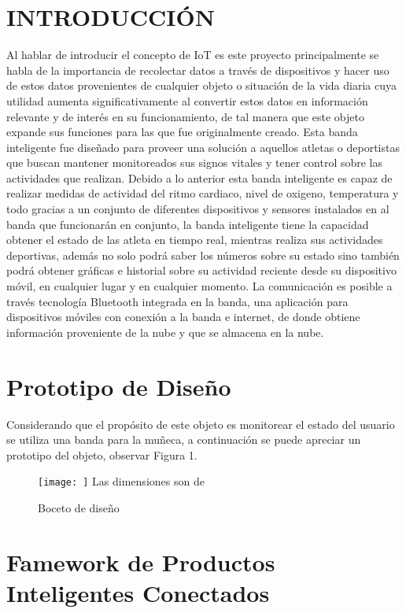 \documentclass[osajnl,twocolumn,showpacs,superscriptaddress,10pt]{revtex4-1}
\begin{document}
\section{INTRODUCCIÓN}
Al hablar de introducir el concepto de IoT es este proyecto principalmente se habla de la importancia de recolectar datos a través de dispositivos y hacer uso de estos datos provenientes de cualquier objeto o situación de la vida diaria cuya utilidad aumenta significativamente al convertir estos datos en información relevante y de interés en su funcionamiento, de tal manera que este objeto expande sus funciones para las que fue originalmente creado. Esta banda inteligente fue diseñado para proveer una solución a aquellos atletas o deportistas que buscan mantener monitoreados sus signos vitales y tener control sobre las actividades que realizan. Debido a lo anterior esta banda inteligente es capaz de realizar medidas de actividad del ritmo cardiaco, nivel de oxigeno, temperatura y todo gracias a un conjunto de diferentes dispositivos y sensores instalados en al banda que funcionarán en conjunto, la banda inteligente tiene la capacidad obtener el estado de las atleta en tiempo real, mientras realiza sus actividades deportivas, además no solo podrá saber los números sobre su estado sino también podrá obtener gráficas e historial sobre su actividad reciente desde su dispositivo móvil, en cualquier lugar y en cualquier momento. La comunicación es posible a través tecnología Bluetooth integrada en la banda, una aplicación para dispositivos móviles con conexión a la banda e internet, de donde obtiene información proveniente de la nube y que se almacena en la nube.

\section{Prototipo de Diseño}
Considerando que el propósito de este objeto es monitorear el estado del usuario se utiliza una banda para la muñeca, a continuación se puede apreciar un prototipo del objeto, observar Figura 1.


\begin{figure} [H] \centering 
\caption{Boceto de diseño}

\texttt{[image: ]} 
Las dimensiones son de 
\end{figure}

\section{Famework de Productos Inteligentes Conectados}
\end{document}
